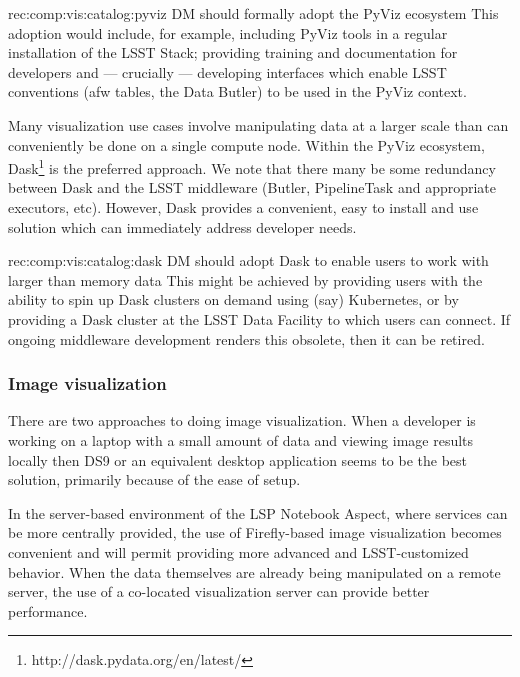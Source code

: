 \begin{recommendation}
  {rec:comp:vis:catalog:pyviz}
  {DM should formally adopt the PyViz ecosystem}
This adoption would include, for example, including PyViz tools in a regular installation of the LSST Stack; providing training and documentation for developers and --- crucially --- developing interfaces which enable LSST conventions (afw tables, the Data Butler) to be used in the PyViz context.
\end{recommendation}

Many visualization use cases involve manipulating data at a larger scale than can conveniently be done on a single compute node.
Within the PyViz ecosystem, Dask\footnote{http://dask.pydata.org/en/latest/} is the preferred approach.
We note that there many be some redundancy between Dask and the LSST middleware (Butler, PipelineTask and appropriate executors, etc).
However, Dask provides a convenient, easy to install and use solution which can immediately address developer needs.

\begin{recommendation}
  {rec:comp:vis:catalog:dask}
  {DM should adopt Dask to enable users to work with larger than memory data}
This might be achieved by providing users with the ability to spin up Dask clusters on demand using (say) Kubernetes, or by providing a Dask cluster at the LSST Data Facility to which users can connect.
If ongoing middleware development renders this obsolete, then it can be retired.
\end{recommendation}

\subsubsection{Image visualization}
\label{sec:comp:vis:image}

There are two approaches to doing image visualization.
When a developer is working on a laptop with a small amount of data and viewing image results locally then DS9 or an equivalent desktop application seems to be the best solution, primarily because of the ease of setup.

In the server-based environment of the LSP Notebook Aspect, where services can be more centrally provided, the use of Firefly-based image visualization becomes convenient and will permit providing more advanced and LSST-customized behavior.
When the data themselves are already being manipulated on a remote server, the use of a co-located visualization server can provide better performance.

